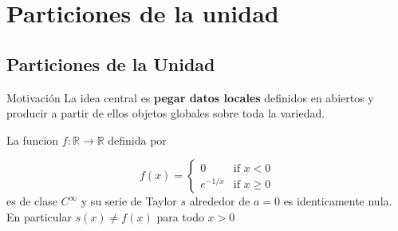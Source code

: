 \chapter{Particiones de la unidad}
\label{ch:teo-8}
\section{Particiones de la Unidad}
\begin{bookremark}{Motivación}
La idea central es \textbf{pegar datos locales} definidos en abiertos y producir a partir de ellos objetos globales sobre toda la variedad.

\end{bookremark}
\begin{booktheorem}{}
La funcion $f:\mathbb{R}\rightarrow\mathbb{R}$ definida por

\[
f(x) = \begin{cases}0 & \text{if } x < 0 \\ e^{-1/x}  & \text{if } x \geq 0 \end{cases}
\]
es de clase $C^{\infty}$ y su serie de Taylor $s$ alrededor de $a=0$ es identicamente nula. En particular $s(x)\neq f(x)$ para todo $x>0$

\end{booktheorem}
\label{blk:54d8a6}
